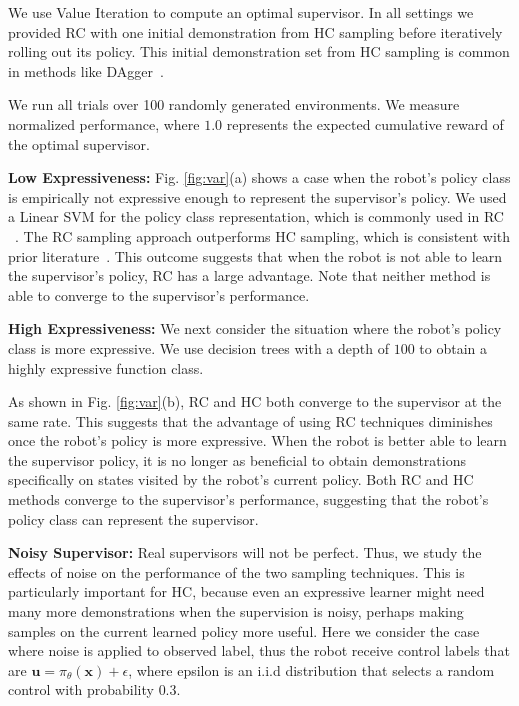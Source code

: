 \documentclass[10pt, conference]{ieeeconf}      %
\newcommand{\bu}{\mathbf{u}}
\newcommand{\bx}{\mathbf{x}}
\begin{document}
We use Value Iteration to compute an optimal supervisor. In all settings we provided RC with one initial demonstration from HC sampling before iteratively rolling out its policy. This initial demonstration set from HC sampling is common in methods like DAgger~\cite{ross2010reduction}.

We run all trials over 100 randomly generated environments.
We measure normalized performance, where $1.0$ represents the expected cumulative reward of the optimal supervisor.

\noindent \textbf{Low Expressiveness:} Fig. \ref{fig:var}(a) shows a case when the robot's policy class is empirically not expressive enough to represent the supervisor's policy.
We used a Linear SVM for the policy class representation, which is commonly used in RC ~\cite{ross2010efficient,ross2010reduction,ross2013learning}. The RC sampling approach outperforms HC sampling, which is consistent with prior literature~\cite{ross2010efficient,ross2010reduction}.
This outcome suggests that when the robot is not able to learn the supervisor's policy, RC has a large advantage. Note that neither method is able to converge to the supervisor's performance. 

\noindent \textbf{High Expressiveness:}
We next consider the situation where the robot's policy class is more expressive. We use decision trees with a depth of $100$ to obtain a highly expressive function class. 

As shown in Fig. \ref{fig:var}(b), RC and HC both converge to the supervisor at the same rate. This suggests that the advantage of using RC techniques diminishes once the robot's policy is more expressive. When the robot is better able to learn the supervisor policy, it is no longer as beneficial to obtain demonstrations specifically on states visited by the robot's current policy. Both RC and HC methods converge to the supervisor's performance, suggesting that the robot's policy class can represent the supervisor.


\noindent \textbf{Noisy Supervisor:}
Real supervisors will not be perfect. Thus, we study the effects of noise on the performance of the two sampling techniques. This is particularly important for HC, because even an expressive learner might need many more demonstrations when the supervision is noisy, perhaps making samples on the current learned policy more useful. Here we consider the case where noise is applied to observed label, thus the robot receive control labels that are $\bu = \pi_{\theta}(\bx) + \epsilon$,  where epsilon is an i.i.d distribution that selects a random control with probability $0.3$.
\end{document}
